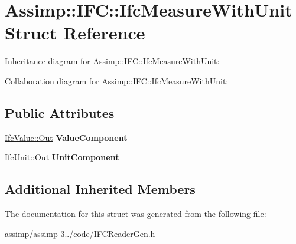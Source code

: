 \hypertarget{struct_assimp_1_1_i_f_c_1_1_ifc_measure_with_unit}{\section{Assimp\+:\+:I\+F\+C\+:\+:Ifc\+Measure\+With\+Unit Struct Reference}
\label{struct_assimp_1_1_i_f_c_1_1_ifc_measure_with_unit}
}


Inheritance diagram for Assimp\+:\+:I\+F\+C\+:\+:Ifc\+Measure\+With\+Unit\+:


Collaboration diagram for Assimp\+:\+:I\+F\+C\+:\+:Ifc\+Measure\+With\+Unit\+:
\subsection*{Public Attributes}
\begin{DoxyCompactItemize}
\item 
\hypertarget{struct_assimp_1_1_i_f_c_1_1_ifc_measure_with_unit_a03be7bd59bae2ff17731cf2610eb5c15}{\hyperlink{classboost_1_1shared__ptr}{Ifc\+Value\+::\+Out} {\bfseries Value\+Component}}\label{struct_assimp_1_1_i_f_c_1_1_ifc_measure_with_unit_a03be7bd59bae2ff17731cf2610eb5c15}

\item 
\hypertarget{struct_assimp_1_1_i_f_c_1_1_ifc_measure_with_unit_a622e54235698ab81c9912f6fe91254a8}{\hyperlink{classboost_1_1shared__ptr}{Ifc\+Unit\+::\+Out} {\bfseries Unit\+Component}}\label{struct_assimp_1_1_i_f_c_1_1_ifc_measure_with_unit_a622e54235698ab81c9912f6fe91254a8}

\end{DoxyCompactItemize}
\subsection*{Additional Inherited Members}


The documentation for this struct was generated from the following file\+:\begin{DoxyCompactItemize}
\item 
assimp/assimp-\/3../code/I\+F\+C\+Reader\+Gen.\+h\end{DoxyCompactItemize}
